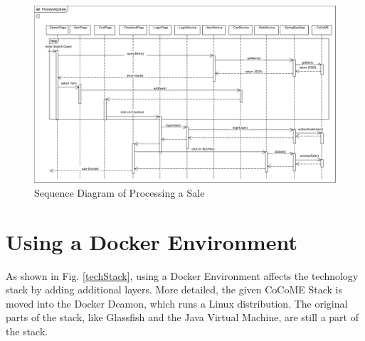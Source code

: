 \begin{figure}[!h]
	\includegraphics[width=\textwidth]{img/appProcessSale.png}
	\caption{Sequence Diagram of Processing a Sale}
	\label{SequenceAppSale}
\end{figure}

\newpage

\section{Using a Docker Environment} \label{Docker}

As shown in Fig. \ref{techStack}, using a Docker Environment affects the technology stack by adding additional layers. More detailed, the given CoCoME Stack is moved into the Docker Deamon, which runs a Linux distribution. The original parts of the stack, like Glassfish and the Java Virtual Machine, are still a part of the stack.
	
